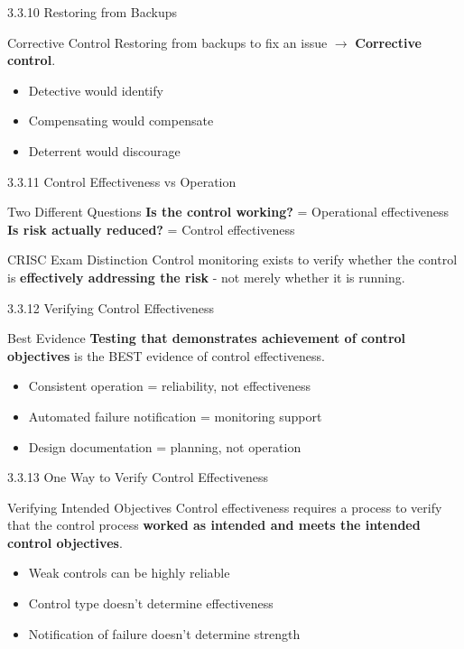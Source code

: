 \documentclass{beamer}
\begin{document}
	\begin{frame}{3.3.10 Restoring from Backups}
		\begin{block}{Corrective Control}
			Restoring from backups to fix an issue $\rightarrow$ \textbf{Corrective control}.
		\end{block}
		\begin{itemize}
			\item Detective would identify
			\item Compensating would compensate
			\item Deterrent would discourage
		\end{itemize}
	\end{frame}
	
	\begin{frame}{3.3.11 Control Effectiveness vs Operation}
		\begin{block}{Two Different Questions}
			\textbf{Is the control working?} = Operational effectiveness \\
			\textbf{Is risk actually reduced?} = Control effectiveness
		\end{block}
		\begin{alertblock}{CRISC Exam Distinction}
			Control monitoring exists to verify whether the control is \textbf{effectively addressing the risk} - not merely whether it is running.
		\end{alertblock}
	\end{frame}
	
	\begin{frame}{3.3.12 Verifying Control Effectiveness}
		\begin{block}{Best Evidence}
			\textbf{Testing that demonstrates achievement of control objectives} is the BEST evidence of control effectiveness.
		\end{block}
		\begin{itemize}
			\item Consistent operation = reliability, not effectiveness
			\item Automated failure notification = monitoring support
			\item Design documentation = planning, not operation
		\end{itemize}
	\end{frame}
	
	\begin{frame}{3.3.13 One Way to Verify Control Effectiveness}
		\begin{block}{Verifying Intended Objectives}
			Control effectiveness requires a process to verify that the control process \textbf{worked as intended and meets the intended control objectives}.
		\end{block}
		\begin{itemize}
			\item Weak controls can be highly reliable
			\item Control type doesn't determine effectiveness
			\item Notification of failure doesn't determine strength
		\end{itemize}
	\end{frame}
	
\end{document}
